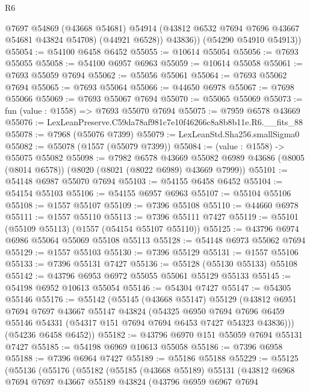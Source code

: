 \begin{lexlean}{R6}
\begin{coremodule}
            @7697
            @54869
            (@43668 @54681)
            @54914
            (@43812 @6532 @7694 @7696 @43667 @54681 @43824 @54708)
            (@44921 @6528))
          @43836))
      (@54290 @54910 @54913))
@55054 := @54100 @6458 @6452
@55055 := @10614 @55054
@55056 := @7693 @55055
@55058 := @54100 @6957 @6963
@55059 := @10614 @55058
@55061 := @7693 @55059 @7694
@55062 := @55056 @55061
@55064 := @7693 @55062 @7694
@55065 := @7693 @55064
@55066 := @44650 @6978
@55067 := @7698 @55066
@55069 := @7693 @55067 @7694
@55070 := @55065 @55069
@55073 := fun (value : @1558) => @7693 @55070 @7694
@55075 := @7959 @6578 @43669
@55076 := LexLeanPreserve.C59da78af981c7e10f46266c8a8b8b11e.R6.__fits_88
@55078 := @7968 (@55076 @7399)
@55079 := LexLeanStd.Sha256.smallSigma0
@55082 := @55078 (@1557 (@55079 @7399))
@55084 := (value : @1558) -> @55075 @55082
@55098 := @7982
    @6578
    @43669
    @55082
    @6989
    @43686
    (@8005 (@8014 @6578))
    (@8020 (@8021 (@8022 @6989) @43669 @7999))
@55101 := @54148 @6987 @55070 @7694
@55103 := @54155 @6458 @6452
@55104 := @54154 @55103
@55106 := @54155 @6957 @6963
@55107 := @55104 @55106
@55108 := @1557 @55107
@55109 := @7396 @55108
@55110 := @44660 @6978
@55111 := @1557 @55110
@55113 := @7396 @55111 @7427
@55119 := @55101 (@55109 @55113) (@1557 (@54154 @55107 @55110))
@55125 := @43796 @6974 @6986 @55064 @55069 @55108 @55113
@55128 := @54148 @6973 @55062 @7694
@55129 := @1557 @55103
@55130 := @7396 @55129
@55131 := @1557 @55106
@55133 := @7396 @55131 @7427
@55136 := @55128 (@55130 @55133) @55108
@55142 := @43796 @6953 @6972 @55055 @55061 @55129 @55133
@55145 := @54198 @6952 @10613 @55054
@55146 := @54304 @7427
@55147 := @54305 @55146
@55176 := @55142
    (@55145
      (@43668 @55147)
      @55129
      (@43812
        @6951
        @7694
        @7697
        @43667
        @55147
        @43824
        (@54325
          @6950
          @7694
          @7696
          @6459
          @55146
          @54331
          (@54317 @151 @7694 @7694 @6453 @7427 @54323 @43836)))
      (@54236 @6458 @6452))
@55182 := @43796 @6970 @151 @55059 @7694 @55131 @7427
@55185 := @54198 @6969 @10613 @55058
@55186 := @7396 @6958
@55188 := @7396 @6964 @7427
@55189 := @55186 @55188
@55229 := @55125
    (@55136
      (@55176
        (@55182
          (@55185
            (@43668 @55189)
            @55131
            (@43812
              @6968
              @7694
              @7697
              @43667
              @55189
              @43824
              (@43796
                @6959
                @6967
                @7694

\end{coremodule}
\end{lexlean}
